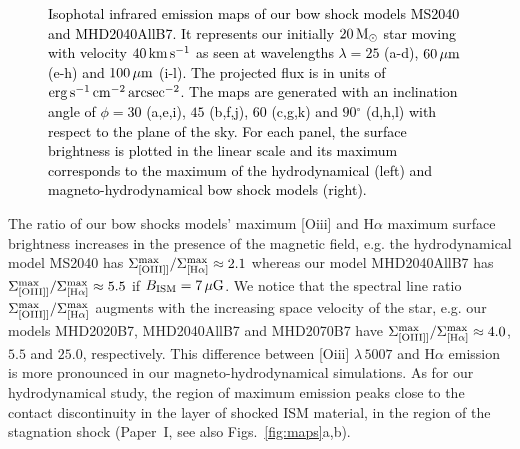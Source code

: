 \documentclass[useAMS,usenatbib]{mn2e}
\newcommand{\degree}{\ensuremath{^\circ}}
\begin{document}
\begin{figure}
\begin{minipage}[b]{ 0.32\textwidth}
	\end{minipage}		
	\caption{
	         \textcolor{black}{
	         Isophotal infrared emission maps of our bow shock models MS2040 and MHD2040AllB7. 
	         It represents our initially $20\, \rm M_{\odot}$ star moving with velocity $40\, \rm km\, \rm
s^{-1}$ as seen at wavelengths $\lambda=25$ (a-d), $60\, \rm \mu m$ (e-h) and $100\, \rm \mu m$ (i-l). The projected
flux is in units of $\rm erg\, \rm s^{-1}\, \rm cm^{-2}\, \rm arcsec^{-2}$. 
The maps are generated with an inclination 
angle of $\phi=30$ (a,e,i), $45$ (b,f,j), $60$ (c,g,k) and $90\degree$ (d,h,l) with respect to 
the plane of the sky. For each panel, the surface brightness is plotted in the linear scale and 
its maximum corresponds to the maximum of the hydrodynamical (left) and 
magneto-hydrodynamical bow shock models (right). 
		 } 
		 }
	\label{fig:maps1}  
\end{figure}




The ratio of our bow shocks models' maximum [O{\sc iii}] and H$\alpha$ maximum
surface brightness increases \textcolor{black}{in} the presence of the magnetic field, e.g. the
hydrodynamical model MS2040 has $\Sigma_{[\rm O{\sc III}]]}^{\rm
max}/\Sigma_{[\rm H\alpha]}^{\rm max}\approx2.1$ whereas our model MHD2040AllB7 has
$\Sigma_{[\rm O{\sc III}]]}^{\rm max}/\Sigma_{[\rm H\alpha]}^{\rm
max}\approx5.5$ if $B_{\rm ISM}=7\, \mu \rm G$. We notice that the spectral line
ratio $\Sigma_{[\rm O{\sc III}]]}^{\rm max}/ \Sigma_{[\rm H\alpha]}^{\rm max}$
augments with the increasing space velocity of the star, e.g. our models
MHD2020B7, MHD2040AllB7 and MHD2070B7 have $\Sigma_{[\rm O{\sc III}]]}^{\rm
max}/\Sigma_{[\rm H\alpha]}^{\rm max}\approx4.0$, $5.5$ and $25.0$,
respectively. This difference between [O{\sc iii}] $\lambda \, 5007$ and 
H$\alpha$ emission is more pronounced in our magneto-hydrodynamical simulations.
As for our hydrodynamical study, the region of maximum emission peaks close to
the contact discontinuity in the layer of shocked ISM material, in the region of
the stagnation shock (Paper~I, see also Figs.~\ref{fig:maps}a,b).
\end{document}
